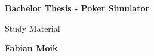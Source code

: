 

\begin{titlepage}
       \begin{center}
             \begin{huge}
                   \textbf{Bachelor Thesis - Poker Simulator}
             \end{huge}
       \end{center}
       \begin{center}
             \begin{large}
		Study Material
             \end{large}
       \end{center}
       \begin{center}
             \begin{large}
                 \textbf{Fabian Moik}
             \end{large}
       \end{center}
\end{titlepage}





%    
%    


\tableofcontents


